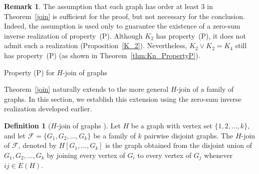 \documentclass[12pt,reqno]{amsart}
\makeatletter
\theoremstyle{definition}
\newtheorem{defn}[thm]{Definition}
\newtheorem{rem}[thm]{Remark}
\numberwithin{equation}{subsection}
\numberwithin{equation}{section}
\def\section{\def\@secnumfont{\mdseries}\@startsection{section}{1}%
  \z@{.7\linespacing\@plus\linespacing}{.5\linespacing}%
  {\normalfont\scshape\centering}}
\def\det{\operatorname{det}}
\makeatother
\begin{document}
\begin{rem}
The assumption that each graph has order at least $3$ in Theorem~\ref{join} is sufficient for the proof, but not necessary for the conclusion. Indeed, the assumption is used only to guarantee the existence of a zero-sum inverse realization of property~(P). Although $K_2$ has property~(P), it does not admit such a realization (Proposition~\ref{K_2}). Nevertheless,
\( K_2\vee K_2=K_4
\)
still has property~(P) (as shown in Theorem~\ref{thm:Kn_PropertyP}).
\end{rem}

\section{Property (P) for $H$-join of graphs}\label{sec:H-join}

Theorem~\ref{join} naturally extends to the more general $H$-join of a family of graphs. In this section, we establish this extension using the zero-sum inverse realization developed earlier.
\begin{defn}[$H$-join of graphs {\cite[p.~737]{cardoso}}]
Let $H$ be a graph with vertex set $\{1,2,\dots,k\}$, and let $\mathcal{F} =\{G_1, G_2, \dots, G_k\}$ be a family of $k$ pairwise disjoint graphs. The $H$-join of $\mathcal{F}$, denoted by 
\(
H[G_1,\dots,G_k]
\)
is the graph obtained from the disjoint union of $G_1,G_2,\dots,G_k$ by joining every vertex of $G_i$ to every vertex of $G_j$ whenever $ij\in E(H)$.
\end{defn}
\end{document}
